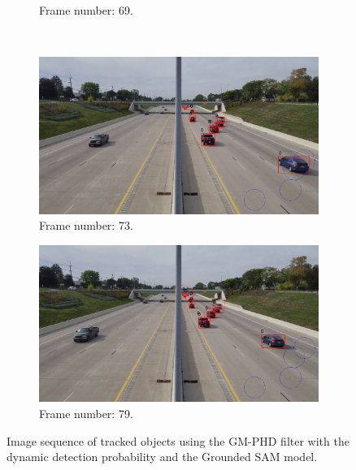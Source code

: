 \begin{figure}[H]
\begin{subfigure}{0.48\textwidth}
        \caption{Frame number: 69.}
        \label{fig:E1-V1-S3:06}
    \end{subfigure}
    \\
    \begin{subfigure}{0.48\textwidth}
        \centering
        \includegraphics[width=\linewidth]{../../../experiments/E1/V1/DINO/73}
        \caption{Frame number: 73.}
        \label{fig:E1-V1-S3:07}
    \end{subfigure}
    \begin{subfigure}{0.48\textwidth}
        \centering
        \includegraphics[width=\linewidth]{../../../experiments/E1/V1/DINO/78}
        \caption{Frame number: 79.}
        \label{fig:E1-V1-S3:08}
    \end{subfigure}
    \caption{Image sequence of tracked objects using the GM-PHD filter with the dynamic detection probability and the
    Grounded SAM model.}
    \label{fig:E1-V1-S3}
\end{figure}
